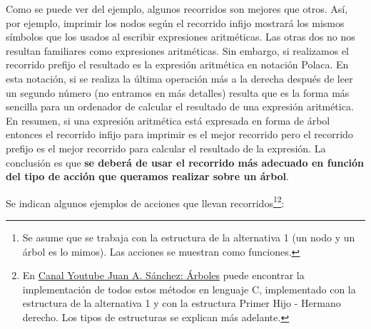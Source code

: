 Como se puede ver del ejemplo, algunos recorridos son mejores que otros. Así, por ejemplo, imprimir los nodos según el recorrido infijo mostrará los mismos símbolos que los usados al escribir expresiones aritméticas. Las otras dos no nos resultan familiares como expresiones aritméticas. 
Sin embargo, si realizamos el recorrido prefijo el resultado es la expresión aritmética en notación Polaca. En esta notación, si se realiza la última operación más a la derecha después de leer un segundo número (no entramos en más detalles) resulta que es la forma más sencilla para un ordenador de calcular el resultado de una expresión aritmética. En resumen, si una expresión aritmética está expresada en forma de árbol entonces el recorrido infijo para imprimir es el mejor recorrido pero el recorrido prefijo es el mejor recorrido para calcular el resultado de la expresión. La conclusión es que \textbf{se deberá de usar el  recorrido más adecuado en función del tipo de acción que queramos realizar sobre un árbol}.

Se indican algunos ejemplos de acciones que llevan recorridos\footnote{Se asume que se trabaja con la estructura de la alternativa 1 (un nodo y un árbol es lo mimos). Las acciones se muestran como funciones.}\footnote{En \href{https://youtu.be/ylBSGxtoR5g}{Canal Youtube Juan A. Sánchez: Árboles} puede encontrar la implementación de todos estos métodos en lenguaje C, implementado con la estructura de la alternativa 1 y con la estructura Primer Hijo - Hermano derecho. Los tipos de estructuras se explican más adelante.}:


